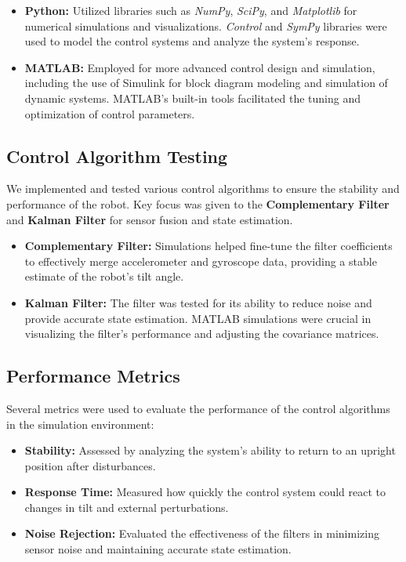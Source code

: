 \begin{itemize}
\item \textbf{Python:} Utilized libraries such as \textit{NumPy}, \textit{SciPy}, and \textit{Matplotlib} for numerical simulations and visualizations. \textit{Control} and \textit{SymPy} libraries were used to model the control systems and analyze the system's response.
\item \textbf{MATLAB:} Employed for more advanced control design and simulation, including the use of Simulink for block diagram modeling and simulation of dynamic systems. MATLAB's built-in tools facilitated the tuning and optimization of control parameters.
\end{itemize}

\subsection{Control Algorithm Testing}
We implemented and tested various control algorithms to ensure the stability and performance of the robot. Key focus was given to the \textbf{Complementary Filter} and \textbf{Kalman Filter} for sensor fusion and state estimation.

\begin{itemize}
\item \textbf{Complementary Filter:} Simulations helped fine-tune the filter coefficients to effectively merge accelerometer and gyroscope data, providing a stable estimate of the robot's tilt angle.
\item \textbf{Kalman Filter:} The filter was tested for its ability to reduce noise and provide accurate state estimation. MATLAB simulations were crucial in visualizing the filter's performance and adjusting the covariance matrices.
\end{itemize}

\subsection{Performance Metrics}
Several metrics were used to evaluate the performance of the control algorithms in the simulation environment:

\begin{itemize}
\item \textbf{Stability:} Assessed by analyzing the system's ability to return to an upright position after disturbances.
\item \textbf{Response Time:} Measured how quickly the control system could react to changes in tilt and external perturbations.
\item \textbf{Noise Rejection:} Evaluated the effectiveness of the filters in minimizing sensor noise and maintaining accurate state estimation.
\end{itemize}

